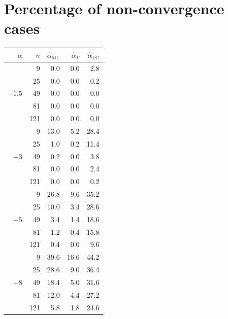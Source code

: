 \documentclass[10pt,a4paper]{article}
\begin{document}
\vspace{0.5cm}

\section{Percentage of non-convergence cases }

\vspace{0.5cm}

\begin{minipage}{0.5\linewidth}
\begin{tabular}{rrrrr}
	\toprule
	$\alpha$ & $n$ & $\widehat{\alpha}_{\text{ML}}$ & $\widehat{\alpha}_{\Gamma}$ & $\widehat{\alpha}_{\text{LC}}$\\  
	\midrule
	\multirow{5 }{*}{$-1.5$}
	& 9 & 0.0 & 0.0 & 2.8 \\ 
	& 25 & 0.0 & 0.0 & 0.2 \\ 
	& 49 & 0.0 & 0.0 & 0.0 \\ 
	& 81 & 0.0 & 0.0 & 0.0 \\ 
	& 121 & 0.0 & 0.0 & 0.0 \\  
	\midrule
	\multirow{5 }{*}{$-3$}
	& 9 & 13.0 & 5.2 & 28.4 \\ 
	& 25 & 1.0 & 0.2 & 11.4 \\ 
	& 49 & 0.2 & 0.0 & 3.8 \\ 
	& 81 & 0.0 & 0.0 & 2.4 \\ 
	& 121 & 0.0 & 0.0 & 0.2 \\    
	\midrule
	\multirow{5 }{*}{$-5$}
	& 9 & 26.8 & 9.6 & 35.2 \\ 
	& 25 & 10.0 & 3.4 & 28.6 \\ 
	& 49 & 3.4 & 1.4 & 18.6 \\ 
	& 81 & 1.2 & 0.4 & 15.8 \\ 
	& 121 & 0.4 & 0.0 & 9.6 \\   
	\midrule
	\multirow{5 }{*}{$-8$}
	& 9 & 39.6 & 16.6 & 44.2 \\ 
	& 25 & 28.6 & 9.0 & 36.4 \\ 
	& 49 & 18.4 & 5.0 & 31.6 \\ 
	& 81 & 12.0 & 4.4 & 27.2 \\ 
	& 121 & 5.8 & 1.8 & 24.6 \\ 
	\bottomrule
\end{tabular}
\end{minipage}
\;
\end{document}
